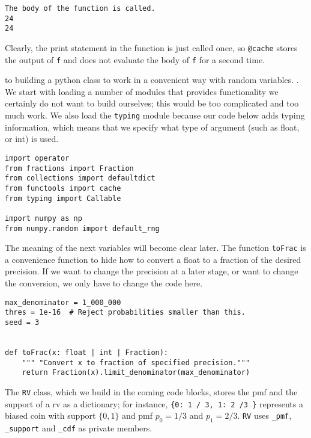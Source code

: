 \documentclass[stochastic-or]{subfiles}
\begin{document}
\begin{verbatim}
The body of the function is called.
24
24
\end{verbatim}

Clearly, the print statement in the function is just called once, so \texttt{@cache} stores the output of \texttt{f} and does not evaluate the body of \texttt{f} for a second time.



 to building a python class to work in a convenient way with random variables.
.
We start with loading a number of modules that provides functionality we certainly do not want to build ourselves; this would be too complicated and too much work.
We also load the \texttt{typing} module because our code below adds typing information, which means that we specify what type of argument (such as float, or int) is used.
\begin{verbatim}
import operator
from fractions import Fraction
from collections import defaultdict
from functools import cache
from typing import Callable

import numpy as np
from numpy.random import default_rng
\end{verbatim}

The meaning of the next variables will become clear later.
The function \texttt{toFrac} is a convenience function to hide how to convert a float to a fraction of the desired precision.
If we want to change the precision at a later stage, or want to change the conversion, we only have to change the code here.
\begin{verbatim}
max_denominator = 1_000_000
thres = 1e-16  # Reject probabilities smaller than this.
seed = 3


def toFrac(x: float | int | Fraction):
    """ "Convert x to fraction of specified precision."""
    return Fraction(x).limit_denominator(max_denominator)
\end{verbatim}

The \texttt{RV} class, which we build in the coming code blocks, stores the pmf and the support of a rv as a dictionary; for instance, \texttt{\{0: 1 / 3, 1: 2 /3 \}} represents a biased coin with support \(\{0, 1\}\) and pmf \(p_{0} = 1/3\) and \(p_{1} = 2/3\). \texttt{RV} uses \texttt{\_pmf}, \texttt{\_support} and \texttt{\_cdf} as private members.
\end{document}
